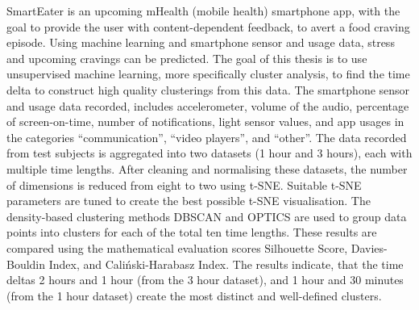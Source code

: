 SmartEater is an upcoming mHealth (mobile health) smartphone app, with the goal to provide the user with content-dependent feedback, to avert a food craving episode. Using machine learning and  smartphone sensor and usage data, stress and upcoming cravings can be predicted. The goal of this thesis is to use unsupervised machine learning, more specifically cluster analysis, to find the time delta to construct high quality clusterings from this data. The smartphone sensor and usage data recorded, includes accelerometer, volume of the audio, percentage of screen-on-time, number of notifications, light sensor values, and app usages in the categories “communication”, “video players”, and “other”. The data recorded from test subjects is aggregated into two datasets (1 hour and 3 hours), each with multiple time lengths. After cleaning and normalising these datasets, the number of dimensions is reduced from eight to two using t-SNE. Suitable t-SNE parameters are tuned to create the best possible t-SNE visualisation. The density-based clustering methods DBSCAN and OPTICS are used to group data points into clusters for each of the total ten time lengths. These results are compared using the mathematical evaluation scores Silhouette Score, Davies-Bouldin Index, and Caliński-Harabasz Index. The results indicate, that the time deltas 2 hours and 1 hour (from the 3 hour dataset), and 1 hour and 30 minutes (from the 1 hour dataset) create the most distinct and well-defined clusters.